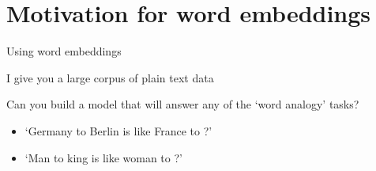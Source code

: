 \documentclass[12pt,aspectratio=169,handout]{beamer}
\begin{document}
%
%
%	
%	
%	
%	

%
%
%
%	
%	





\section{Motivation for word embeddings}


\begin{frame}{Using word embeddings}

I give you a large corpus of plain text data

Can you build a model that will answer any of the `word analogy' tasks?

\begin{itemize}
	\item `Germany to Berlin is like France to ?'
	\item `Man to king is like woman to ?'
\end{itemize}

\end{frame}
\end{document}
